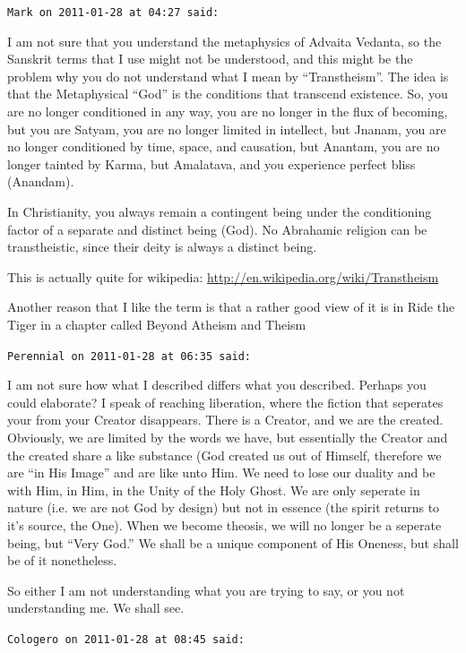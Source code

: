 \begin{footnotesize}
\begin{sffamily}
\hfill

\texttt{Mark on 2011-01-28 at 04:27 said:}

I am not sure that you understand the metaphysics of Advaita Vedanta, so the Sanskrit terms that I use might not be understood, and this might be the problem why you do not understand what I mean by ``Transtheism''. The idea is that the Metaphysical ``God'' is the conditions that transcend existence. So, you are no longer conditioned in any way, you are no longer in the flux of becoming, but you are Satyam, you are no longer limited in intellect, but Jnanam, you are no longer conditioned by time, space, and causation, but Anantam, you are no longer tainted by Karma, but Amalatava, and you experience perfect bliss (Anandam).

In Christianity, you always remain a contingent being under the conditioning factor of a separate and distinct being (God). No Abrahamic religion can be transtheistic, since their deity is always a distinct being.

This is actually quite for wikipedia: \url{http://en.wikipedia.org/wiki/Transtheism}


Another reason that I like the term is that a rather good view of it is in Ride the Tiger in a chapter called Beyond Atheism and Theism

\hfill

\texttt{Perennial on 2011-01-28 at 06:35 said:}

I am not sure how what I described differs what you described. Perhaps you could elaborate? I speak of reaching liberation, where the fiction that seperates your from your Creator disappears. There is a Creator, and we are the created. Obviously, we are limited by the words we have, but essentially the Creator and the created share a like substance (God created us out of Himself, therefore we are ``in His Image'' and are like unto Him. We need to lose our duality and be with Him, in Him, in the Unity of the Holy Ghost. We are only seperate in nature (i.e. we are not God by design) but not in essence (the spirit returns to it's source, the One). When we become theosis, we will no longer be a seperate being, but ``Very God.'' We shall be a unique component of His Oneness, but shall be of it nonetheless.

So either I am not understanding what you are trying to say, or you not understanding me. We shall see.

\hfill

\texttt{Cologero on 2011-01-28 at 08:45 said:}


\end{sffamily}
\end{footnotesize}
